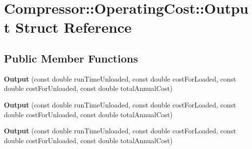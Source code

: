 \hypertarget{struct_compressor_1_1_operating_cost_1_1_output}{}\section{Compressor\+:\+:Operating\+Cost\+:\+:Output Struct Reference}
\label{struct_compressor_1_1_operating_cost_1_1_output}
\subsection*{Public Member Functions}
\begin{DoxyCompactItemize}
\item 
\mbox{\label{struct_compressor_1_1_operating_cost_1_1_output_af510363e57a9f58bdd56f9a16784697e}} 
{\bfseries Output} (const double run\+Time\+Unloaded, const double cost\+For\+Loaded, const double cost\+For\+Unloaded, const double total\+Annual\+Cost)
\item 
\mbox{\label{struct_compressor_1_1_operating_cost_1_1_output_af510363e57a9f58bdd56f9a16784697e}} 
{\bfseries Output} (const double run\+Time\+Unloaded, const double cost\+For\+Loaded, const double cost\+For\+Unloaded, const double total\+Annual\+Cost)
\item 
\mbox{\label{struct_compressor_1_1_operating_cost_1_1_output_af510363e57a9f58bdd56f9a16784697e}} 
{\bfseries Output} (const double run\+Time\+Unloaded, const double cost\+For\+Loaded, const double cost\+For\+Unloaded, const double total\+Annual\+Cost)
\end{DoxyCompactItemize}
